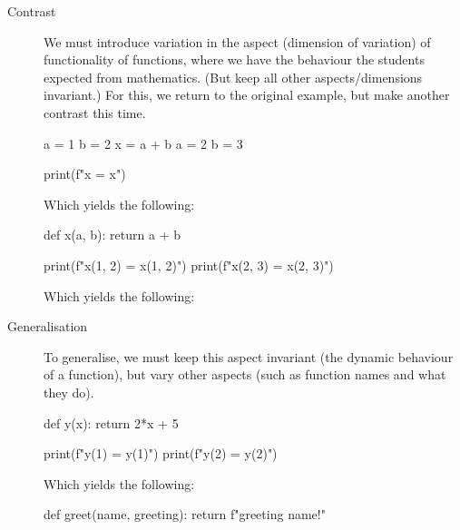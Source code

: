 \begin{description}
  \item [Contrast] We must introduce variation in the aspect (dimension of 
    variation) of functionality of functions, where we have the behaviour the 
    students expected from mathematics.
    (But keep all other aspects/dimensions invariant.)
    For this, we return to the original example, but make another contrast this 
    time.

    \begin{minipage}[t]{0.45\columnwidth}
      \begin{pyblock}[funcC1][highlightlines=3]
a = 1
b = 2
x = a + b
a = 2
b = 3

print(f"x = {x}")
      \end{pyblock}

      \vspace{0.5em}
      Which yields the following:
      \printpythontex[verbatim]
    \end{minipage}
    \hfill
    \begin{minipage}[t]{0.45\columnwidth}
      \begin{pyblock}[funcC2][highlightlines={1-2}]
def x(a, b):
  return a + b



print(f"x(1, 2) = {x(1, 2)}")
print(f"x(2, 3) = {x(2, 3)}")
      \end{pyblock}

      \vspace{0.5em}
      Which yields the following:
      \printpythontex[verbatim]
    \end{minipage}

  \item[Generalisation] To generalise, we must keep this aspect invariant (the 
    dynamic behaviour of a function), but vary other aspects (such as function 
    names and what they do).

    \begin{minipage}[t]{0.45\columnwidth}
      \begin{pyblock}[funcG1]
def y(x):
  return 2*x + 5

print(f"y(1) = {y(1)}")
print(f"y(2) = {y(2)}")
      \end{pyblock}

      \vspace{0.5em}
      Which yields the following:
      \printpythontex[verbatim]
    \end{minipage}
    \hfill
    \begin{minipage}[t]{0.45\columnwidth}
      \begin{pyblock}[funcG2]
def greet(name, greeting):
  return f"{greeting} {name}!"


\end{pyblock}
\end{minipage}
\end{description}

